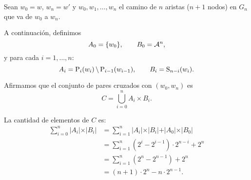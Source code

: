 \documentclass[11pt]{article}
\begin{document}
\begin{demo}
	Sean $w_0 = w$, $w_n = w'$ y $w_0, w_1, \dots, w_n$ el camino de
	$n$ aristas ($n + 1$ nodos) en $G_n$ que va de $w_0$ a $w_n$.

	A continuación, definimos
	\[ A_0 = \lbrace w_0 \rbrace, \qquad
		B_0 = \mathcal{A}^n, \]
	y para cada $i = 1, \dots, n$:
	\[ A_i = \text{P}_{i}(w_i) \,\backslash\, \text{P}_{i - 1}(w_{i - 1}), \qquad
		B_i = \text{S}_{n - i}(w_i). \]

	Afirmamos que el conjunto de pares cruzados con $(w_0, w_n)$ es
	\[ C = \bigcup_{i = 0}^n A_i \times B_i. \]

	La cantidad de elementos de $C$ es:
	\begin{align*}
		\sum_{i = 0}^n \vert A_i \vert \times \vert B_i \vert
		 & = \sum_{i = 1}^n \vert A_i \vert \times \vert B_i \vert + \vert A_0
		\vert \times \vert B_0 \vert                                           \\
		 & = \sum_{i = 1}^n \left( 2^{i} - 2^{i - 1} \right) \cdot 2^{n - i} +
		2^n                                                                    \\
		 & = \sum_{i = 1}^n \left( 2^n - 2^{n - 1} \right) + 2^n               \\
		 & = (n + 1) \cdot 2^n - n \cdot 2^{n - 1}.
	\end{align*}
\end{demo}

{}

\end{document}
